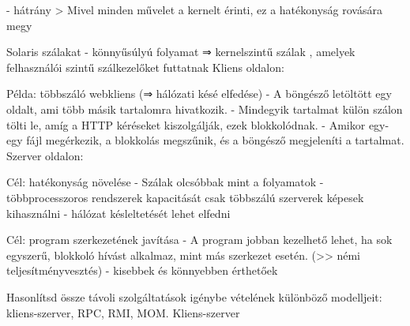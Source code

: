 \documentclass[12pt]{article}
\begin{document}
\begin{description}
                                                                        - hátrány
                                                                        > Mivel minden művelet a kernelt érinti, ez a hatékonyság rovására megy
                                                                    \item Solaris szálakat
                                                                        - könnyűsúlyú folyamat ⇒ kernelszintű szálak , amelyek felhasználói szintű szálkezelőket futtatnak
                                                                        Kliens oldalon:
                                                                    \item Példa: többszáló webkliens (⇒ hálózati késé elfedése)
                                                                        - A böngésző letöltött egy oldalt, ami több másik tartalomra hivatkozik.
                                                                        - Mindegyik tartalmat külön szálon tölti le, amíg a HTTP kéréseket kiszolgálják, ezek blokkolódnak.
                                                                        - Amikor egy-egy fájl megérkezik, a blokkolás megszűnik, és a böngésző megjeleníti a tartalmat.
                                                                        Szerver oldalon:
                                                                    \item Cél: hatékonyság növelése
                                                                        - Szálak olcsóbbak mint a folyamatok
                                                                        - többprocesszoros rendszerek kapacitását csak többszálú szerverek képesek kihasználni
                                                                        - hálózat késleltetését lehet elfedni
                                                                    \item Cél: program szerkezetének javítása
                                                                        - A program jobban kezelhető lehet, ha sok egyszerű, blokkoló hívást alkalmaz, mint más szerkezet esetén. (>> némi teljesítményvesztés)
                                                                        - kisebbek és könnyebben érthetőek 
                                                                    \item  Hasonlítsd össze távoli szolgáltatások igénybe vételének különböző modelljeit: kliens-szerver, RPC, RMI, MOM.
                                                                        Kliens-szerver

\end{description}
\end{document}
